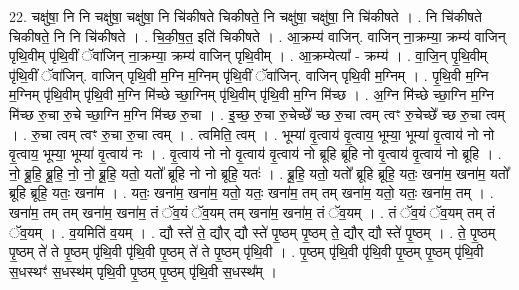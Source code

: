 \documentclass[17pt]{extarticle}
\begin{document}
22. चक्षु॑षा॒ नि नि चक्षु॑षा॒ चक्षु॑षा॒ नि चि॑कीषते चिकीषते॒ नि चक्षु॑षा॒ चक्षु॑षा॒ नि चि॑कीषते । . नि चि॑कीषते चिकीषते॒ नि नि चि॑कीषते । . चि॒की॒ष॒त॒ इति॑ चिकीषते । . आ॒क्रम्य॑ वाजिन्. वाजिन् ना॒क्रम्या॒ क्रम्य॑ वाजिन् पृथि॒वीम् पृ॑थि॒वीं ॅवा॑जिन् ना॒क्रम्या॒ क्रम्य॑ वाजिन् पृथि॒वीम् । . आ॒क्रम्येत्या᳚ - क्रम्य॑ । . वा॒जि॒न् पृ॒थि॒वीम् पृ॑थि॒वीं ॅवा॑जिन्. वाजिन् पृथि॒वी म॒ग्नि म॒ग्निम् पृ॑थि॒वीं ॅवा॑जिन्. वाजिन् पृथि॒वी म॒ग्निम् । . पृ॒थि॒वी म॒ग्नि म॒ग्निम् पृ॑थि॒वीम् पृ॑थि॒वी म॒ग्नि मि॑च्छे च्छा॒ग्निम् पृ॑थि॒वीम् पृ॑थि॒वी म॒ग्नि मि॑च्छ । . अ॒ग्नि मि॑च्छे च्छा॒ग्नि म॒ग्नि मि॑च्छ रु॒चा रु॒चे च्छा॒ग्नि म॒ग्नि मि॑च्छ रु॒चा । . इ॒च्छ॒ रु॒चा रु॒चेच्छे᳚ च्छ रु॒चा त्वम् त्वꣳ रु॒चेच्छे᳚ च्छ रु॒चा त्वम् । . रु॒चा त्वम् त्वꣳ रु॒चा रु॒चा त्वम् । . त्वमिति॒ त्वम् । . भूम्या॑ वृ॒त्वाय॑ वृ॒त्वाय॒ भूम्या॒ भूम्या॑ वृ॒त्वाय॑ नो नो वृ॒त्वाय॒ भूम्या॒ भूम्या॑ वृ॒त्वाय॑ नः । . वृ॒त्वाय॑ नो नो वृ॒त्वाय॑ वृ॒त्वाय॑ नो ब्रूहि ब्रूहि नो वृ॒त्वाय॑ वृ॒त्वाय॑ नो ब्रूहि । . नो॒ ब्रू॒हि॒ ब्रू॒हि॒ नो॒ नो॒ ब्रू॒हि॒ यतो॒ यतो᳚ ब्रूहि नो नो ब्रूहि॒ यतः॑ । . ब्रू॒हि॒ यतो॒ यतो᳚ ब्रूहि ब्रूहि॒ यतः॒ खना॑म॒ खना॑म॒ यतो᳚ ब्रूहि ब्रूहि॒ यतः॒ खना॑म । . यतः॒ खना॑म॒ खना॑म॒ यतो॒ यतः॒ खना॑म॒ तम् तम् खना॑म॒ यतो॒ यतः॒ खना॑म॒ तम् । . खना॑म॒ तम् तम् खना॑म॒ खना॑म॒ तं ॅव॒यं ॅव॒यम् तम् खना॑म॒ खना॑म॒ तं ॅव॒यम् । . तं ॅव॒यं ॅव॒यम् तम् तं ॅव॒यम् । . व॒यमिति॑ व॒यम् । . द्यौ स्ते॑ ते॒ द्यौर् द्यौ स्ते॑ पृ॒ष्ठम् पृ॒ष्ठम् ते॒ द्यौर् द्यौ स्ते॑ पृ॒ष्ठम् । . ते॒ पृ॒ष्ठम् पृ॒ष्ठम् ते॑ ते पृ॒ष्ठम् पृ॑थि॒वी पृ॑थि॒वी पृ॒ष्ठम् ते॑ ते पृ॒ष्ठम् पृ॑थि॒वी । . पृ॒ष्ठम् पृ॑थि॒वी पृ॑थि॒वी पृ॒ष्ठम् पृ॒ष्ठम् पृ॑थि॒वी स॒धस्थꣳ॑ स॒धस्थ॑म् पृथि॒वी पृ॒ष्ठम् पृ॒ष्ठम् पृ॑थि॒वी स॒धस्थ᳚म् । \newline
\end{document}
